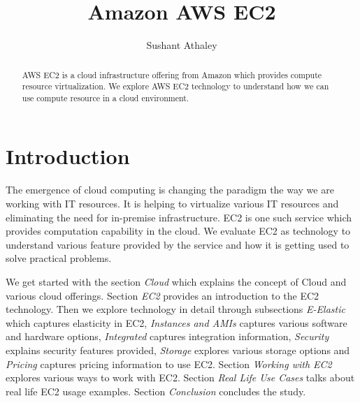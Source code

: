 
\title{Amazon AWS EC2}


\author{Sushant Athaley}

\renewcommand{\shortauthors}{G. v. Laszewski}


\begin{abstract}
AWS EC2 is a cloud infrastructure offering from Amazon which provides compute resource virtualization. We explore AWS EC2 technology to understand how we can use compute resource in a cloud environment. 

\end{abstract}


\maketitle

\section{Introduction}
The emergence of cloud computing is changing the paradigm the way we are working with IT resources. It is helping to virtualize various IT resources and eliminating the need for in-premise infrastructure. EC2 is one such service which provides computation capability in the cloud. We evaluate EC2 as technology to understand various feature provided by the service and how it is getting used to solve practical problems.

We get started with the section \emph{Cloud} which explains the concept of Cloud and various cloud offerings. Section \emph{EC2} provides an introduction to the EC2 technology. Then we explore technology in detail through subsections \emph{E-Elastic} which captures elasticity in EC2, \emph{Instances and AMIs} captures various software and hardware options, \emph{Integrated} captures integration information, \emph{Security} explains security features provided, \emph{Storage} explores various storage options and \emph{Pricing} captures pricing information to use EC2.
Section \emph{Working with EC2} explores various ways to work with EC2. Section \emph{Real Life Use Cases} talks about real life EC2 usage examples. Section \emph{Conclusion} concludes the study. 

